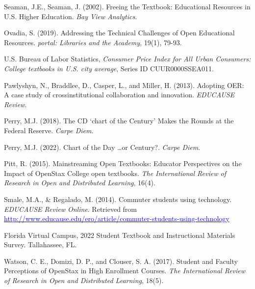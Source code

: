 \documentclass[11pt]{article}
\newcommand{\alink}[2]{\href{#1}{\textcolor{blue}{#2}}}
\begin{document}
\begin{thebibliography}{99}
   Seaman, J.E., Seaman, J. (2002). Freeing the Textbook: Educational Resources in U.S. Higher Education. {\em Bay View Analytics}. %

   Ovadia, S. (2019). Addressing the Technical Challenges of Open Educational Resources.  {\em portal: Libraries and the Academy}, 19(1), 79-93.%

   U.S. Bureau of Labor Statistics, {\em Consumer Price Index for All Urban Consumers: College textbooks in U.S. city average}, Series ID CUUR0000SSEA011.%

   Pawlyshyn, N., Braddlee, D., Casper, L., and Miller, H. (2013). Adopting OER: A case study of crossinstitutional collaboration and innovation. {\em EDUCAUSE Review}.

   Perry, M.J. (2018). The CD `chart of the Century' Makes the Rounds at the Federal Reserve. {\em Carpe Diem}.%

   Perry, M.J. (2022). Chart of the Day \ldots or Century?. {\em Carpe Diem}.%

   Pitt, R. (2015). Mainstreaming Open Textbooks: Educator Perspectives on the Impact of OpenStax College open textbooks. {\em The International Review of Research in Open and Distributed Learning}, 16(4).

   Smale, M.A., \& Regalado, M. (2014). Commuter students using technology. {\em EDUCAUSE Review Online}. Retrieved from \alink{http://www.educause.edu/ero/article/commuter-students-using-technology}{http://www.educause.edu/ero/article/commuter-students-using-technology}

   Florida Virtual Campus, 2022 Student Textbook and Instructional Materials Survey. Tallahassee, FL. %

   Watson, C. E., Domizi, D. P., and Clouser, S. A. (2017). Student and Faculty Perceptions of OpenStax in High Enrollment Courses. {\em The International Review of Research in Open and Distributed Learning}, 18(5). %

\end{thebibliography}
\end{document}
